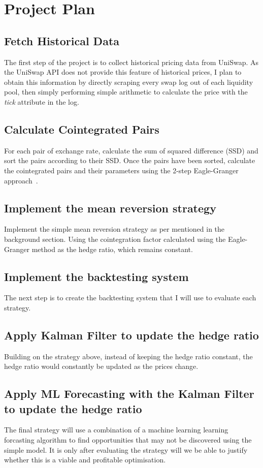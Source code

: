 \chapter{Project Plan}

\section{Fetch Historical Data}
The first step of the project is to collect historical pricing data from UniSwap. As the UniSwap API does not provide this feature of historical prices, I plan to obtain this information by directly scraping every swap log out of each liquidity pool, then simply performing simple arithmetic to calculate the price with the \textit{tick} attribute in the log.

\section{Calculate Cointegrated Pairs}
For each pair of exchange rate, calculate the sum of squared difference (SSD) and sort the pairs according to their SSD. Once the pairs have been sorted, calculate the cointegrated pairs and their parameters using the 2-step Eagle-Granger approach~\cite{doi:10.1080/14697688.2016.1164337}.

\section{Implement the mean reversion strategy}
Implement the simple mean reversion strategy as per mentioned in the background section. Using the cointegration factor calculated using the Eagle-Granger method as the hedge ratio, which remains constant.

\section{Implement the backtesting system}
The next step is to create the backtesting system that I will use to evaluate each strategy.

\section{Apply Kalman Filter to update the hedge ratio}
Building on the strategy above, instead of keeping the hedge ratio constant, the hedge ratio would constantly be updated as the prices change.

\section{Apply ML Forecasting with the Kalman Filter to update the hedge ratio}
The final strategy will use a combination of a machine learning learning forcasting algorithm to find opportunities that may not be discovered using the simple model. It is only after evaluating the strategy will we be able to justify whether this is a viable and profitable optimisation.

